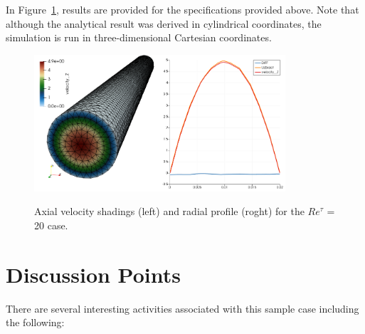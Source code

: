 \documentclass{article}
\begin{document}
In Figure~\ref{fig:results}, results are provided for the specifications
provided above. Note that although the analytical result was derived in 
cylindrical coordinates, the simulation is run in three-dimensional
Cartesian coordinates.

\begin{figure}[!htbp]
  \centering
  {
   \includegraphics[height=2.0in]{images/3d_tet4_pipe_result.png}
  }
  \caption{Axial velocity shadings (left) and radial profile (roght) for 
    the $Re^\tau$ = 20 case.}
  \label{fig:results}
\end{figure}

\section{Discussion Points}

There are several interesting activities associated with this sample case 
including the following:
\end{document}
